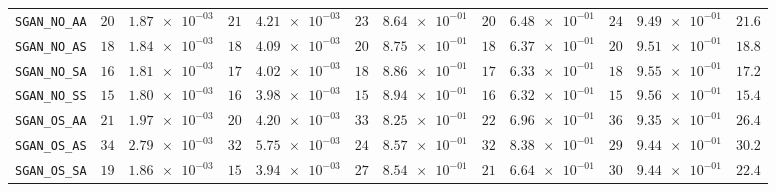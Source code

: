 \begin{xltabular}{\textwidth}{l||cC|cC|cC|cC|cC||c}
	\texttt{SGAN\_NO\_AA} & $ 20$ & $ \num{1.87e-03}$ & $ 21$ & $ \num{4.21e-03}$ & $ 23$ & $ \num{8.64e-01}$ & $ 20$ & $ \num{6.48e-01}$ & $ 24$ & $ \num{9.49e-01}$ & $ 21.6$  \\
	\texttt{SGAN\_NO\_AS} & $ 18$ & $ \num{1.84e-03}$ & $ 18$ & $ \num{4.09e-03}$ & $ 20$ & $ \num{8.75e-01}$ & $ 18$ & $ \num{6.37e-01}$ & $ 20$ & $ \num{9.51e-01}$ & $ 18.8$  \\
	\texttt{SGAN\_NO\_SA} & $ 16$ & $ \num{1.81e-03}$ & $ 17$ & $ \num{4.02e-03}$ & $ 18$ & $ \num{8.86e-01}$ & $ 17$ & $ \num{6.33e-01}$ & $ 18$ & $ \num{9.55e-01}$ & $ 17.2$  \\
	\texttt{SGAN\_NO\_SS} & $ 15$ & $ \num{1.80e-03}$ & $ 16$ & $ \num{3.98e-03}$ & $ 15$ & $ \num{8.94e-01}$ & $ 16$ & $ \num{6.32e-01}$ & $ 15$ & $ \num{9.56e-01}$ & $ 15.4$  \\
	\texttt{SGAN\_OS\_AA} & $ 21$ & $ \num{1.97e-03}$ & $ 20$ & $ \num{4.20e-03}$ & $ 33$ & $ \num{8.25e-01}$ & $ 22$ & $ \num{6.96e-01}$ & $ 36$ & $ \num{9.35e-01}$ & $ 26.4$  \\
	\texttt{SGAN\_OS\_AS} & $ 34$ & $ \num{2.79e-03}$ & $ 32$ & $ \num{5.75e-03}$ & $ 24$ & $ \num{8.57e-01}$ & $ 32$ & $ \num{8.38e-01}$ & $ 29$ & $ \num{9.44e-01}$ & $ 30.2$  \\
	\texttt{SGAN\_OS\_SA} & $ 19$ & $ \num{1.86e-03}$ & $ 15$ & $ \num{3.94e-03}$ & $ 27$ & $ \num{8.54e-01}$ & $ 21$ & $ \num{6.64e-01}$ & $ 30$ & $ \num{9.44e-01}$ & $ 22.4$  \\

\end{xltabular}
